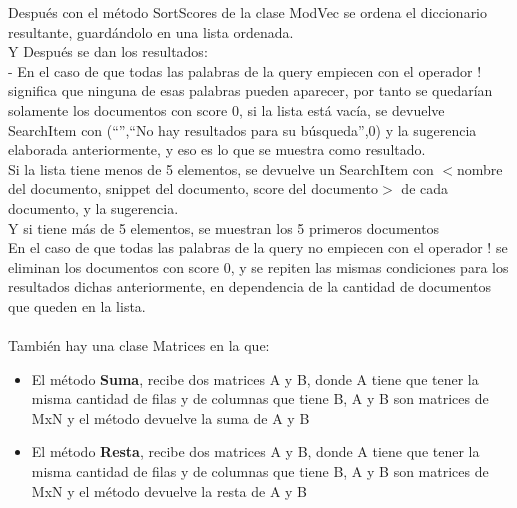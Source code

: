 \documentclass[12pt, a4paper]{article}
\begin{document}
\begin{enumerate}
            Después con el método SortScores de la clase ModVec se ordena el diccionario
            resultante, guardándolo en una lista ordenada.\\
            Y Después se dan los resultados:\\
            - En el caso de que todas las palabras de la query empiecen con el operador !
            significa que ninguna de esas palabras pueden aparecer,
            por tanto se quedarían solamente los documentos con score 0,
            si la lista está vacía, se devuelve SearchItem con
            (“”,“No hay resultados para su búsqueda”,0) y
            la sugerencia elaborada anteriormente, y eso es lo que se muestra como resultado.\\
            Si la lista tiene menos de 5 elementos, se devuelve un SearchItem con
            $<$nombre del documento, snippet del documento, score del documento$>$
            de cada documento, y la sugerencia.\\
            Y si tiene más de 5 elementos, se muestran los 5 primeros documentos\\
            En el caso de que todas las palabras de la query no empiecen con el operador !
            se eliminan los documentos con score 0, y se repiten las mismas condiciones
            para los resultados dichas anteriormente, en dependencia de la cantidad de
            documentos que queden en la lista.\\
            \\
            También hay una clase Matrices en la que:\\

            \begin{itemize}
                  \item El método \textbf{Suma}, recibe dos matrices A y B, donde A tiene que tener
                        la misma cantidad de filas y de columnas que tiene B, A y B son matrices de MxN
                        y el método devuelve la suma de A y B

                  \item El método \textbf{Resta}, recibe dos matrices A y B, donde A tiene que tener la
                        misma cantidad de filas y de columnas que tiene B, A y B son matrices de MxN y
                        el método devuelve la resta de A y B


\end{itemize}
\end{enumerate}
\end{document}
